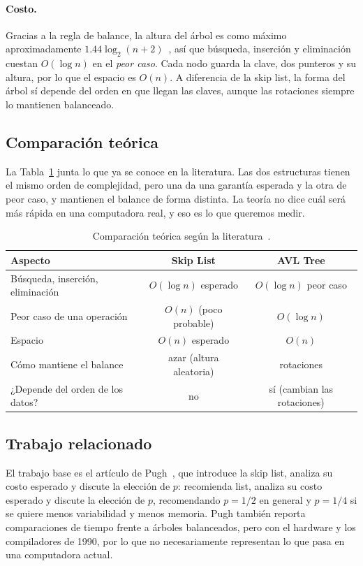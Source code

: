 \documentclass[11pt,a4paper]{article}
\begin{document}
\paragraph{Costo.}
Gracias a la regla de balance, la altura del árbol es como máximo
aproximadamente $1.44 \log_2(n+2)$~\cite{knuth1998}, así que búsqueda,
inserción y eliminación cuestan $O(\log n)$ en el \emph{peor caso}. Cada nodo
guarda la clave, dos punteros y su altura, por lo que el espacio es $O(n)$. A
diferencia de la skip list, la forma del árbol sí depende del orden en que
llegan las claves, aunque las rotaciones siempre lo mantienen balanceado.

\subsection{Comparación teórica}

La Tabla~\ref{tab:teoria} junta lo que ya se conoce en la literatura. Las dos
estructuras tienen el mismo orden de complejidad, pero una da una garantía
esperada y la otra de peor caso, y mantienen el balance de forma distinta.
La teoría no dice cuál será más rápida en una computadora real, y eso es lo
que queremos medir.

\begin{table}[!htb]
\centering
\begin{tabular}{lcc}
\toprule
\textbf{Aspecto} & \textbf{Skip List} & \textbf{AVL Tree} \\
\midrule
Búsqueda, inserción, eliminación & $O(\log n)$ esperado & $O(\log n)$ peor caso \\
Peor caso de una operación       & $O(n)$ (poco probable) & $O(\log n)$ \\
Espacio                          & $O(n)$ esperado & $O(n)$ \\
Cómo mantiene el balance         & azar (altura aleatoria) & rotaciones \\
¿Depende del orden de los datos? & no & sí (cambian las rotaciones) \\
\bottomrule
\end{tabular}
\caption{Comparación teórica según la literatura~\cite{pugh1990,knuth1998}.}
\label{tab:teoria}
\end{table}

\subsection{Trabajo relacionado}

El trabajo base es el artículo de Pugh~\cite{pugh1990}, que introduce la skip
list, analiza su costo esperado y discute la elección de $p$: recomienda
list, analiza su costo esperado y discute la elección de $p$, recomendando
$p = 1/2$ en general y $p = 1/4$ si se quiere menos variabilidad y menos
memoria. Pugh también reporta comparaciones de tiempo frente a árboles
balanceados, pero con el hardware y los compiladores de 1990, por lo que no
necesariamente representan lo que pasa en una computadora actual.
\end{document}
